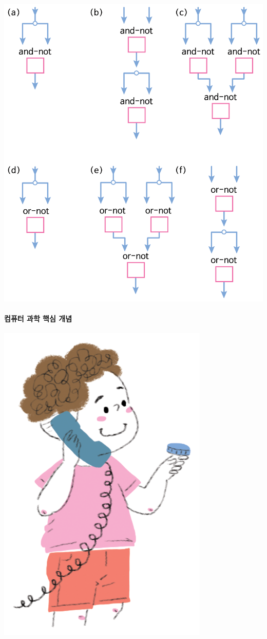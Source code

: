 \documentclass[]{article}
\begin{document}
\includegraphics{csunplugged/05-part/img/ch18-crypto/17-crypto-08-basic-gates.png}

\mbox{}\paragraph{컴퓨터 과학 핵심 개념}\label{section-244}

\includegraphics{csunplugged/05-part/img/ch18-crypto/17-crypto-09-boy-can.png}
\end{document}
